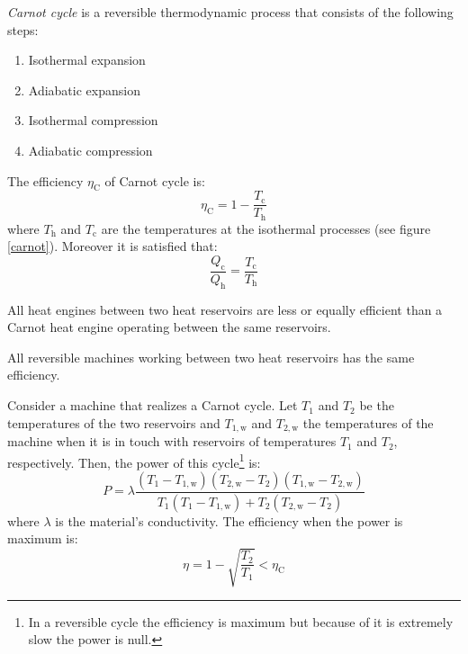 \documentclass[../../../main.tex]{subfiles}
\begin{document}
\begin{multicols}{2}
  \begin{definition}
    \textit{Carnot cycle} is a reversible thermodynamic process that consists of the following steps:
    \begin{enumerate}
      \item Isothermal expansion
      \item Adiabatic expansion
      \item Isothermal compression
      \item Adiabatic compression
    \end{enumerate}
    The efficiency $\eta_\text{C}$ of Carnot cycle is:
    $$\eta_\text{C}=1-\frac{T_\text{c}}{T_\text{h}}$$
    where $T_\text{h}$ and $T_\text{c}$ are the temperatures at the isothermal processes (see figure \ref{carnot}). Moreover it is satisfied that: $$\frac{Q_\text{c}}{Q_\text{h}}=\frac{T_\text{c}}{T_\text{h}}$$
    \begin{center}
      \begin{minipage}{\linewidth}
        \centering
        
        \label{carnot}
      \end{minipage}
    \end{center}
  \end{definition}
  \begin{theorem}
    All heat engines between two heat reservoirs are less or equally efficient than a Carnot heat engine operating between the same reservoirs.
  \end{theorem}
  \begin{corollary}
    All reversible machines working between two heat reservoirs has the same efficiency.
  \end{corollary}
  \begin{prop}
    Consider a machine that realizes a Carnot cycle. Let $T_1$ and $T_2$ be the temperatures of the two reservoirs and $T_{1,\text{w}}$ and $T_{2,\text{w}}$ the temperatures of the machine when it is in touch with reservoirs of temperatures $T_1$ and $T_2$, respectively. Then, the power of this cycle\footnote{In a reversible cycle the efficiency is maximum but because of it is extremely slow the power is null. } is:
    $$P=\lambda\frac{(T_1-T_{1,\text{w}})(T_{2,\text{w}}-T_2)(T_{1,\text{w}}-T_{2,\text{w}})}{T_1(T_1-T_{1,\text{w}})+T_2(T_{2,\text{w}}-T_2)}$$
    where $\lambda$ is the material’s conductivity. The efficiency when the power is maximum is:
    $$\eta=1-\sqrt{\frac{T_2}{T_1}}<\eta_\text{C}$$
  \end{prop}

\end{multicols}
\end{document}
